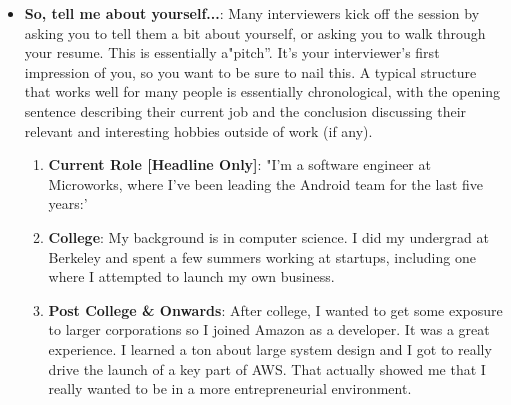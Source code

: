 \documentclass{report}
\begin{document}
\begin{itemize}
\begin{itemize}
                \item \textbf{Empathy}: The candidate tried to understand what was happening to the person. The candidate also showed empathy in knowing what would resolve the teammate's insecurity.
                \item \textbf{Compassion}: Although the teammate was harming the team, the candidate wasn't angry at the team mate. His empathy led him to compassion.
                \item \textbf{Humility}: The candidate was able to admit to his own flaws (not only to the teammate, but also to the interviewer).
                \item \textbf{Teamwork/Helpfulness}: The candidate worked with the teammate to break down the project into manageable chunks.
            \end{itemize}
            You should think about your stories from this perspective. Analyze the actions you took and how you reacted. What personality attributes does your reaction demonstrate?
        \item \textbf{So, tell me about yourself...}:  Many interviewers kick off the session by asking you to tell them a bit about yourself, or asking you to walk through your resume. This is essentially a"pitch''. It's your interviewer's first impression of you, so you want to be sure to nail this.
            \bigbreak \noindent 
            A typical structure that works well for many people is essentially chronological, with the opening sentence describing their current job and the conclusion discussing their relevant and interesting hobbies outside of work (if any).
            \begin{enumerate}
                \item \textbf{Current Role [Headline Only]}: "I'm a software engineer at Microworks, where I've been leading the Android team for the last five years:'
                \item \textbf{College}: My background is in computer science. I did my undergrad at Berkeley and spent a few summers working at startups, including one where I attempted to launch my own business.
                \item \textbf{Post College \& Onwards}: After college, I wanted to get some exposure to larger corporations so I joined Amazon as a developer. It was a great experience. I learned a ton about large system design and I got to really drive the launch of a key part of AWS. That actually showed me that I really wanted to be in a more entrepreneurial environment.

\end{enumerate}
\end{itemize}
\end{document}
